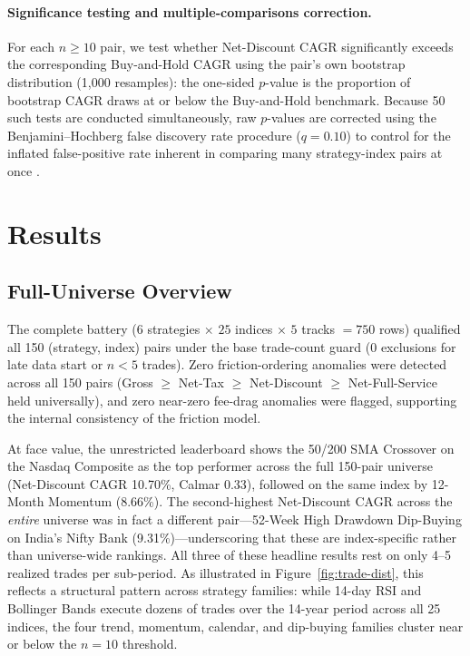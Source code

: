 \documentclass[11pt]{article}
\begin{document}
\paragraph{Significance testing and multiple-comparisons correction.} For each $n \geq 10$ pair, we test whether Net-Discount CAGR significantly exceeds the corresponding Buy-and-Hold CAGR using the pair's own bootstrap distribution (1{,}000 resamples): the one-sided $p$-value is the proportion of bootstrap CAGR draws at or below the Buy-and-Hold benchmark. Because 50 such tests are conducted simultaneously, raw $p$-values are corrected using the Benjamini--Hochberg false discovery rate procedure ($q=0.10$) to control for the inflated false-positive rate inherent in comparing many strategy-index pairs at once \citep{harvey2016}.

\section{Results}
\label{sec:results}

\subsection{Full-Universe Overview}
\label{sec:full-universe}

The complete battery ($6$ strategies $\times$ $25$ indices $\times$ $5$ tracks $=750$ rows) qualified all 150 (strategy, index) pairs under the base trade-count guard (0 exclusions for late data start or $n<5$ trades). Zero friction-ordering anomalies were detected across all 150 pairs (Gross $\geq$ Net-Tax $\geq$ Net-Discount $\geq$ Net-Full-Service held universally), and zero near-zero fee-drag anomalies were flagged, supporting the internal consistency of the friction model.

At face value, the unrestricted leaderboard shows the 50/200 SMA Crossover on the Nasdaq Composite as the top performer across the full 150-pair universe (Net-Discount CAGR 10.70\%, Calmar 0.33), followed on the same index by 12-Month Momentum (8.66\%). The second-highest Net-Discount CAGR across the \emph{entire} universe was in fact a different pair---52-Week High Drawdown Dip-Buying on India's Nifty Bank (9.31\%)---underscoring that these are index-specific rather than universe-wide rankings. All three of these headline results rest on only 4--5 realized trades per sub-period. As illustrated in Figure~\ref{fig:trade-dist}, this reflects a structural pattern across strategy families: while 14-day RSI and Bollinger Bands execute dozens of trades over the 14-year period across all 25 indices, the four trend, momentum, calendar, and dip-buying families cluster near or below the $n=10$ threshold.
\end{document}

